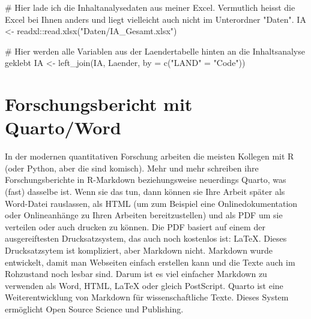 \documentclass[twoside, pagesize, fontsize=11pt, dvipsnames]{scrreport}
\newenvironment{Shaded}{\begin{snugshade}}{\end{snugshade}}
\newcommand{\AttributeTok}[1]{\textcolor[rgb]{0.40,0.45,0.13}{#1}}
\newcommand{\CommentTok}[1]{\textcolor[rgb]{0.37,0.37,0.37}{#1}}
\newcommand{\FunctionTok}[1]{\textcolor[rgb]{0.28,0.35,0.67}{#1}}
\newcommand{\NormalTok}[1]{\textcolor[rgb]{0.00,0.23,0.31}{#1}}
\newcommand{\OtherTok}[1]{\textcolor[rgb]{0.00,0.23,0.31}{#1}}
\newcommand{\SpecialCharTok}[1]{\textcolor[rgb]{0.37,0.37,0.37}{#1}}
\newcommand{\StringTok}[1]{\textcolor[rgb]{0.13,0.47,0.30}{#1}}
\begin{document}
\begin{Shaded}
\begin{Highlighting}[]
\CommentTok{\# Hier lade ich die Inhaltanalysedaten aus meiner Excel. Vermutlich heisst die Excel bei Ihnen anders und liegt vielleicht auch nicht im Unterordner "Daten".}
\NormalTok{IA }\OtherTok{\textless{}{-}}\NormalTok{ readxl}\SpecialCharTok{::}\FunctionTok{read.xlsx}\NormalTok{(}\StringTok{"Daten/IA\_Gesamt.xlsx"}\NormalTok{)}

\CommentTok{\# Hier werden alle Variablen aus der Laendertabelle hinten an die Inhaltsanalyse geklebt}
\NormalTok{IA }\OtherTok{\textless{}{-}} \FunctionTok{left\_join}\NormalTok{(IA, Laender, }\AttributeTok{by =} \FunctionTok{c}\NormalTok{(}\StringTok{"LAND"} \OtherTok{=} \StringTok{"Code"}\NormalTok{))}
\end{Highlighting}
\end{Shaded}


\hypertarget{forschungsbericht-mit-quartoword}{%
\chapter{Forschungsbericht mit
Quarto/Word}\label{forschungsbericht-mit-quartoword}}

In der modernen quantitativen Forschung arbeiten die meisten Kollegen
mit R (oder Python, aber die sind komisch). Mehr und mehr schreiben ihre
Forschungsberichte in R-Markdown beziehungsweise neuerdings Quarto, was
(fast) dasselbe ist. Wenn sie das tun, dann können sie Ihre Arbeit
später als Word-Datei rauslassen, als HTML (um zum Beispiel eine
Onlinedokumentation oder Onlineanhänge zu Ihren Arbeiten
bereitzustellen) und als PDF um sie verteilen oder auch drucken zu
können. Die PDF basiert auf einem der ausgereiftesten Drucksatzsystem,
das auch noch kostenlos ist: LaTeX. Dieses Drucksatzsytem ist
kompliziert, aber Markdown nicht. Markdown wurde entwickelt, damit man
Webseiten einfach erstellen kann und die Texte auch im Rohzustand noch
lesbar sind. Darum ist es viel einfacher Markdown zu verwenden als Word,
HTML, LaTeX oder gleich PostScript. Quarto ist eine Weiterentwicklung
von Markdown für wissenschaftliche Texte. Dieses System ermöglicht Open
Source Science und Publishing.
\end{document}
